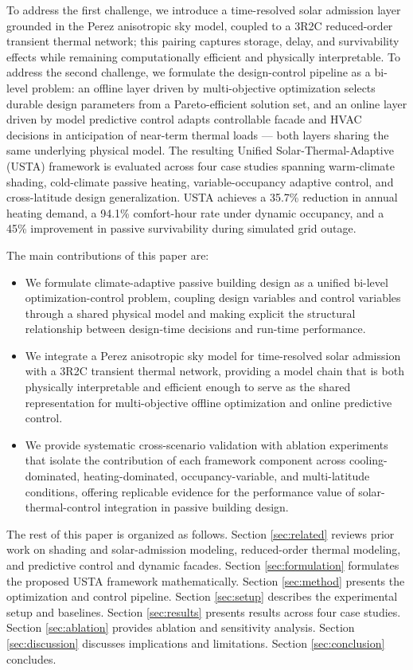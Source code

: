\documentclass[5p,times,twocolumn]{elsarticle}
\begin{document}
To address the first challenge, we introduce a time-resolved solar admission layer grounded in the Perez anisotropic sky model, coupled to a 3R2C reduced-order transient thermal network; this pairing captures storage, delay, and survivability effects while remaining computationally efficient and physically interpretable. To address the second challenge, we formulate the design-control pipeline as a bi-level problem: an offline layer driven by multi-objective optimization selects durable design parameters from a Pareto-efficient solution set, and an online layer driven by model predictive control adapts controllable facade and HVAC decisions in anticipation of near-term thermal loads --- both layers sharing the same underlying physical model. The resulting Unified Solar-Thermal-Adaptive (USTA) framework is evaluated across four case studies spanning warm-climate shading, cold-climate passive heating, variable-occupancy adaptive control, and cross-latitude design generalization. USTA achieves a 35.7\% reduction in annual heating demand, a 94.1\% comfort-hour rate under dynamic occupancy, and a 45\% improvement in passive survivability during simulated grid outage.

The main contributions of this paper are:
\begin{itemize}
  \item We formulate climate-adaptive passive building design as a unified bi-level optimization-control problem, coupling design variables and control variables through a shared physical model and making explicit the structural relationship between design-time decisions and run-time performance.
  \item We integrate a Perez anisotropic sky model for time-resolved solar admission with a 3R2C transient thermal network, providing a model chain that is both physically interpretable and efficient enough to serve as the shared representation for multi-objective offline optimization and online predictive control.
  \item We provide systematic cross-scenario validation with ablation experiments that isolate the contribution of each framework component across cooling-dominated, heating-dominated, occupancy-variable, and multi-latitude conditions, offering replicable evidence for the performance value of solar-thermal-control integration in passive building design.
\end{itemize}

The rest of this paper is organized as follows. Section \ref{sec:related} reviews prior work on shading and solar-admission modeling, reduced-order thermal modeling, and predictive control and dynamic facades. Section \ref{sec:formulation} formulates the proposed USTA framework mathematically. Section \ref{sec:method} presents the optimization and control pipeline. Section \ref{sec:setup} describes the experimental setup and baselines. Section \ref{sec:results} presents results across four case studies. Section \ref{sec:ablation} provides ablation and sensitivity analysis. Section \ref{sec:discussion} discusses implications and limitations. Section \ref{sec:conclusion} concludes.
\end{document}
